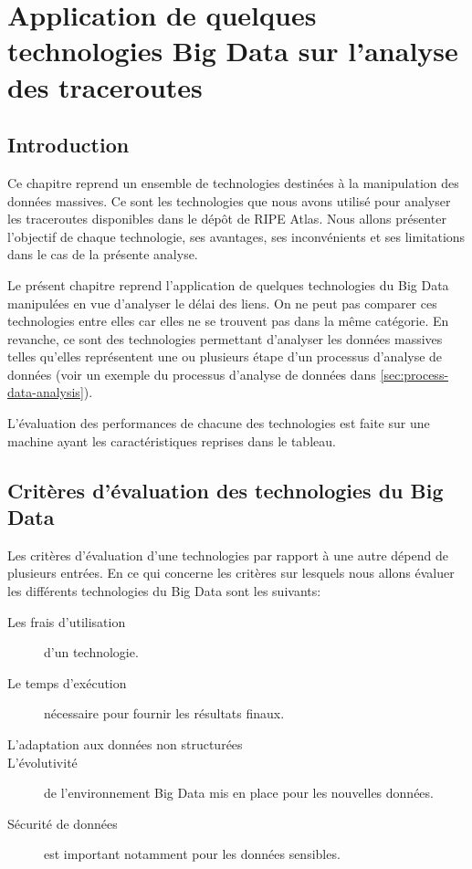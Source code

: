 \chapter{Application de quelques technologies Big Data sur l'analyse des traceroutes}


\section{Introduction}

Ce chapitre reprend un ensemble de   technologies destinées  à la manipulation des données massives. Ce sont les technologies que nous avons utilisé pour analyser les traceroutes disponibles dans le dépôt de RIPE Atlas. Nous allons présenter l'objectif de chaque technologie, ses avantages, ses inconvénients et ses limitations dans le cas de la présente analyse.

Le présent chapitre reprend l'application de quelques technologies du Big Data manipulées en vue d'analyser le délai des liens. On ne peut pas comparer ces technologies entre elles car elles ne se trouvent pas dans la même catégorie. En revanche, ce sont des technologies permettant d'analyser les données massives telles qu'elles représentent une ou plusieurs étape d'un processus d'analyse de données (voir un exemple du processus d'analyse de données dans \ref{sec:process-data-analysis}). 

L'évaluation des performances de chacune des technologies est faite sur une machine ayant les caractéristiques reprises dans le tableau.

\section{Critères d'évaluation des technologies du Big Data}

Les critères d'évaluation d'une technologies par rapport à une autre dépend de plusieurs entrées. En ce qui concerne les critères sur lesquels nous allons évaluer les différents technologies du Big Data sont les suivants:
\begin{description}


\item[Les frais d'utilisation] d'un technologie.
\item[Le temps d'exécution] nécessaire pour fournir les résultats finaux.
\item[L'adaptation aux données non structurées]
\item[L'évolutivité] de l'environnement Big Data mis en place pour les nouvelles données.
\item[Sécurité de données] est important notamment pour les données sensibles.

\end{description}

